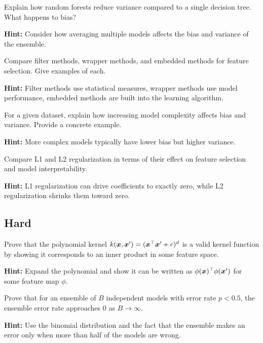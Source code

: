 \begin{problem}
\label{prob:random-forest-bias-variance}
Explain how random forests reduce variance compared to a single decision tree. What happens to bias?

\textbf{Hint:} Consider how averaging multiple models affects the bias and variance of the ensemble.
\end{problem}

\begin{problem}
\label{prob:feature-selection}
Compare filter methods, wrapper methods, and embedded methods for feature selection. Give examples of each.

\textbf{Hint:} Filter methods use statistical measures, wrapper methods use model performance, embedded methods are built into the learning algorithm.
\end{problem}

\begin{problem}
\label{prob:bias-variance}
For a given dataset, explain how increasing model complexity affects bias and variance. Provide a concrete example.

\textbf{Hint:} More complex models typically have lower bias but higher variance.
\end{problem}

\begin{problem}
\label{prob:regularization-effects}
Compare L1 and L2 regularization in terms of their effect on feature selection and model interpretability.

\textbf{Hint:} L1 regularization can drive coefficients to exactly zero, while L2 regularization shrinks them toward zero.
\end{problem}

\subsection*{Hard}

\begin{problem}
\label{prob:svm-kernel-trick}
Prove that the polynomial kernel $k(\boldsymbol{x}, \boldsymbol{x}') = (\boldsymbol{x}^\top \boldsymbol{x}' + c)^d$ is a valid kernel function by showing it corresponds to an inner product in some feature space.

\textbf{Hint:} Expand the polynomial and show it can be written as $\phi(\boldsymbol{x})^\top \phi(\boldsymbol{x}')$ for some feature map $\phi$.
\end{problem}

\begin{problem}
\label{prob:ensemble-theory}
Prove that for an ensemble of $B$ independent models with error rate $p < 0.5$, the ensemble error rate approaches 0 as $B \to \infty$.

\textbf{Hint:} Use the binomial distribution and the fact that the ensemble makes an error only when more than half of the models are wrong.
\end{problem}
